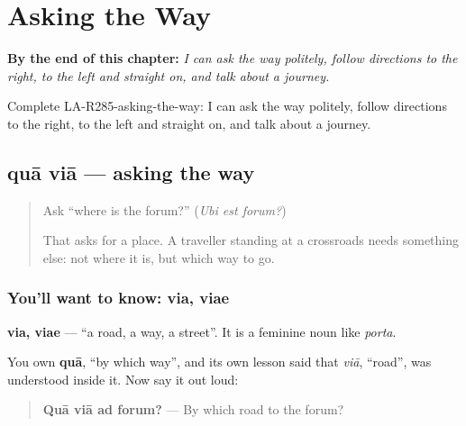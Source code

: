 
\chapter{Asking the Way}
\label{ch:la-asking-the-way}

\begin{chapteropening}
\textbf{By the end of this chapter:} \emph{I can ask the way politely, follow directions to the right, to the left and straight on, and talk about a journey.}

Complete LA-R285-asking-the-way: I can ask the way politely, follow directions to the right, to the left and straight on, and talk about a journey.
\end{chapteropening}

\section[quā viā ad forum?]{quā viā — asking the way}

\label{lesson:LA-C285-qua-via}



\begin{quote}
Ask \textquotedblleft{}where is the forum?\textquotedblright{} (\emph{Ubi est forum?})

That asks for a place. A traveller standing at a crossroads needs something else: not where it is, but which way to go.
\end{quote}

\subsection*{You'll want to know: via, viae}
\textbf{via, viae} — \textquotedblleft{}a road, a way, a street\textquotedblright{}. It is a feminine noun like \emph{porta}.

You own \textbf{quā}, \textquotedblleft{}by which way\textquotedblright{}, and its own lesson said that \emph{viā}, \textquotedblleft{}road\textquotedblright{}, was understood inside it. Now say it out loud:

\begin{quote}
\textbf{Quā viā ad forum?} — By which road to the forum?
\end{quote}

